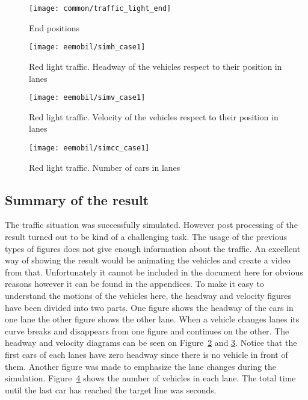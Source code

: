 		\begin{figure}
			\centering
			\texttt{[image: common/traffic\_light\_end]}
			\caption{End positions}
			\label{fig:traffic_light_end}
		\end{figure}
		\begin{figure}
			\centering
			\texttt{[image: eemobil/simh\_case1]}
			\caption{Red light traffic. Headway of the vehicles respect to their position in lanes}
			\label{fig:red_light_situationh}
		\end{figure}
		\begin{figure}
			\centering
			\texttt{[image: eemobil/simv\_case1]}
			\caption{Red light traffic. Velocity of the vehicles respect to their position in lanes}
			\label{fig:red_light_situationv}
		\end{figure}
		\begin{figure}
			\centering
			\texttt{[image: eemobil/simcc\_case1]}
			\caption{Red light traffic. Number of cars in lanes }
			\label{fig:red_light_situationcc}
		\end{figure}
		\subsection*{Summary of the result}
		The traffic situation was successfully simulated. However post processing of the result turned out to be kind of a challenging task. The usage of the previous types of figures does not give enough information about the traffic. An excellent way of showing the result would be animating the vehicles and create a video from that. Unfortunately it cannot be included in the document here for obvious reasons however it can be found in the appendices. To make it easy to understand the motions of the vehicles here, the headway and velocity figures have been divided into two parts. One figure shows the headway of the cars in one lane the other figure shows the other lane. When a vehicle changes lanes its curve breaks and disappears from one figure and continues on the other.
		The headway and velocity diagrams can be seen on Figure~\ref{fig:red_light_situationh} and \ref{fig:red_light_situationv}. Notice that the first cars of each lanes have zero headway since there is no vehicle in front of them. Another figure was made to emphasize the lane changes during the simulation. Figure~\ref{fig:red_light_situationcc} shows the number of vehicles in each lane. The total time until the last car has reached the target line was seconds.
